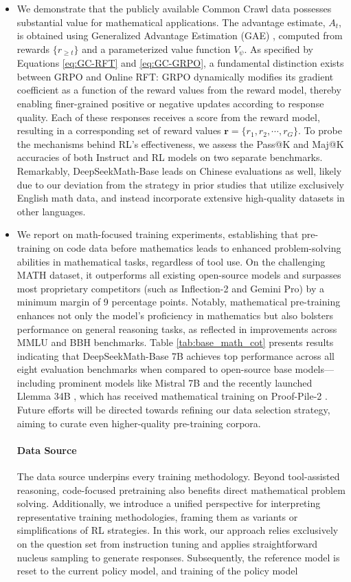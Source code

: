 \begin{itemize}[topsep=0pt]
\begin{itemize}[topsep=0pt]
    \item We demonstrate that the publicly available Common Crawl data possesses substantial value for mathematical applications. The advantage estimate, $A_t$, is obtained using Generalized Advantage Estimation (GAE) \citep{gae}, computed from rewards $\{r_{\ge t}\}$ and a parameterized value function $V_{\psi}$. As specified by Equations \ref{eq:GC-RFT} and \ref{eq:GC-GRPO}, a fundamental distinction exists between GRPO and Online RFT: GRPO dynamically modifies its gradient coefficient as a function of the reward values from the reward model, thereby enabling finer-grained positive or negative updates according to response quality. Each of these responses receives a score from the reward model, resulting in a corresponding set of reward values $\mathbf{r} = \{r_1, r_2, \cdots, r_G\}$. To probe the mechanisms behind RL’s effectiveness, we assess the Pass@K and Maj@K accuracies of both Instruct and RL models on two separate benchmarks. Remarkably, DeepSeekMath-Base leads on Chinese evaluations as well, likely due to our deviation from the strategy in prior studies \citep{minerva,llemma} that utilize exclusively English math data, and instead incorporate extensive high-quality datasets in other languages. \item We report on math-focused training experiments, establishing that pre-training on code data before mathematics leads to enhanced problem-solving abilities in mathematical tasks, regardless of tool use. On the challenging MATH dataset, it outperforms all existing open-source models and surpasses most proprietary competitors (such as Inflection-2 and Gemini Pro) by a minimum margin of 9 percentage points. Notably, mathematical pre-training enhances not only the model’s proficiency in mathematics but also bolsters performance on general reasoning tasks, as reflected in improvements across MMLU \citep{mmlu} and BBH \citep{bbh} benchmarks. Table \ref{tab:base_math_cot} presents results indicating that DeepSeekMath-Base 7B achieves top performance across all eight evaluation benchmarks when compared to open-source base models—including prominent models like Mistral 7B \citep{mistral} and the recently launched Llemma 34B \citep{llemma}, which has received mathematical training on Proof-Pile-2 \citep{llemma}. Future efforts will be directed towards refining our data selection strategy, aiming to curate even higher-quality pre-training corpora. \paragraph{Data Source} The data source underpins every training methodology. Beyond tool-assisted reasoning, code-focused pretraining also benefits direct mathematical problem solving. Additionally, we introduce a unified perspective for interpreting representative training methodologies, framing them as variants or simplifications of RL strategies. In this work, our approach relies exclusively on the question set from instruction tuning and applies straightforward nucleus sampling to generate responses. Subsequently, the reference model is reset to the current policy model, and training of the policy model 
\end{itemize}
\end{itemize}
